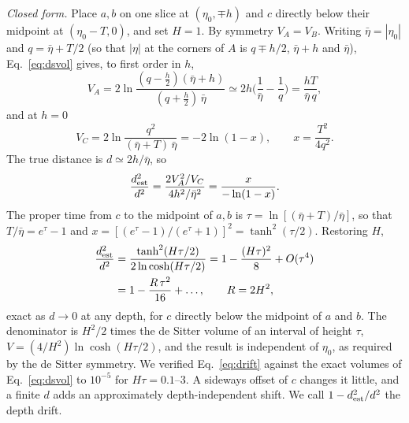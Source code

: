 \documentclass[prd,twocolumn,superscriptaddress,nofootinbib,amsmath,amssymb,floatfix]{revtex4-2}
\begin{document}
\emph{Closed form.} Place $a,b$ on one slice at $(\eta_0,\mp h)$ and $c$ directly below their midpoint at $(\eta_0-T,0)$, and set $H=1$. By symmetry $V_A=V_B$. Writing $\bar\eta=|\eta_0|$ and $q=\bar\eta+T/2$ (so that $|\eta|$ at the corners of $A$ is $q\mp h/2$, $\bar\eta+h$ and $\bar\eta$), Eq.~\eqref{eq:dsvol} gives, to first order in $h$,
\begin{equation}
V_A=2\ln\frac{(q-\tfrac h2)(\bar\eta+h)}{(q+\tfrac h2)\,\bar\eta}\simeq2h\Big(\frac1{\bar\eta}-\frac1q\Big)=\frac{hT}{\bar\eta\,q},
\end{equation}
and at $h=0$
\begin{equation}
V_C=2\ln\frac{q^2}{(\bar\eta+T)\,\bar\eta}=-2\ln(1-x),\qquad x=\frac{T^2}{4q^2}.
\end{equation}
The true distance is $d\simeq2h/\bar\eta$, so
\begin{equation}
\frac{d^2_{\rm est}}{d^2}=\frac{2V_A^2/V_C}{4h^2/\bar\eta^2}=\frac{x}{-\ln(1-x)}.
\end{equation}
The proper time from $c$ to the midpoint of $a,b$ is $\tau=\ln[(\bar\eta+T)/\bar\eta]$, so that $T/\bar\eta=e^{\tau}-1$ and $x=[(e^\tau-1)/(e^\tau+1)]^2=\tanh^2(\tau/2)$. Restoring $H$,
\begin{equation}
\begin{aligned}
\frac{d^2_{\rm est}}{d^2}&=\frac{\tanh^2(H\tau/2)}{2\ln\cosh(H\tau/2)}=1-\frac{(H\tau)^2}{8}+O(\tau^4)\\
&=1-\frac{R\,\tau^2}{16}+\dots,\qquad R=2H^2,
\end{aligned}
\label{eq:drift}
\end{equation}
exact as $d\to0$ at any depth, for $c$ directly below the midpoint of $a$ and $b$. The denominator is $H^2/2$ times the de Sitter volume of an interval of height $\tau$, $V=(4/H^2)\ln\cosh(H\tau/2)$, and the result is independent of $\eta_0$, as required by the de Sitter symmetry. We verified Eq.~\eqref{eq:drift} against the exact volumes of Eq.~\eqref{eq:dsvol} to $10^{-5}$ for $H\tau=0.1$--$3$. A sideways offset of $c$ changes it little, and a finite $d$ adds an approximately depth-independent shift. We call $1-d^2_{\rm est}/d^2$ the depth drift.
\end{document}
